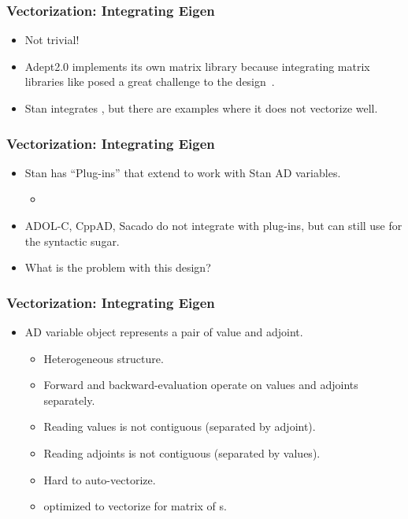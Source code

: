 \begin{frame}
\frametitle{Vectorization: Integrating Eigen}
\begin{itemize}

\item Not trivial!
\item Adept2.0 implements its own matrix library because 
    integrating matrix libraries like  
    posed a great challenge to the design~\cite{hogan:2014}.
\item Stan integrates , but there are examples where it does not vectorize well.

\end{itemize}
\end{frame}

\begin{frame}
\frametitle{Vectorization: Integrating Eigen}
\begin{itemize}

\item Stan has ``Plug-ins'' that extend  to work with Stan AD variables.
    \begin{itemize}
        \item {} 
    \end{itemize}

\item ADOL-C, CppAD, Sacado do not integrate  with plug-ins,
    but can still use  for the syntactic sugar.

\item What is the problem with this design?

\end{itemize}
\end{frame}

\begin{frame}
\frametitle{Vectorization: Integrating Eigen} 
\begin{itemize}

\item AD variable object represents a pair of value and adjoint.
    \begin{itemize}
        \item Heterogeneous structure.
        \item Forward and backward-evaluation operate 
            on values and adjoints separately.
        \item Reading values is not contiguous (separated by adjoint).
        \item Reading adjoints is not contiguous (separated by values).
        \item Hard to auto-vectorize.
        \item {} optimized to vectorize for matrix of s.
    \end{itemize}

\end{itemize}
\end{frame}

